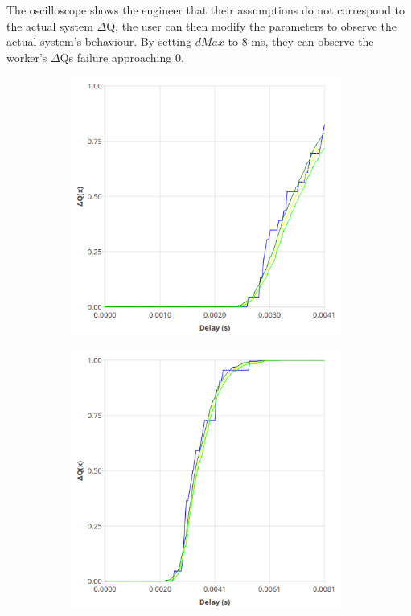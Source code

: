     The oscilloscope shows the engineer that their assumptions do not correspond to the actual system $\Delta$Q, the user can then modify the parameters to observe the actual system's behaviour. By setting $dMax$ to 8 ms, they can observe the worker's $\Delta$Qs failure approaching 0.

\begin{figure}[H]
            \centering
            \begin{subfigure}{.5\textwidth}
                \centering
                \includegraphics[width=0.98\textwidth]{img/overload_2/worker_1.png}
                \label{fig:w1w2}
            \end{subfigure}%
            \begin{subfigure}{.5\textwidth}
                \centering
                \includegraphics[width =0.98\textwidth]{img/overload_2/worker_1_8.png}

\end{subfigure}
\end{figure}
